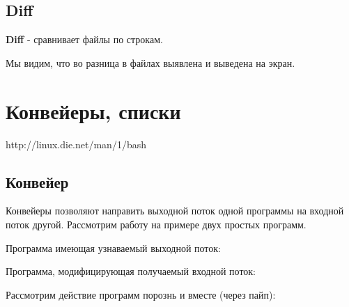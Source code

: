 \documentclass[a4paper]{article}
\begin{document}
\subsection{Diff}
\textbf{Diff} - сравнивает файлы по строкам.

Мы видим, что во разница в файлах выявлена и выведена на экран.

 
\section{Конвейеры, списки}
http://linux.die.net/man/1/bash
\subsection{Конвейер}
Конвейеры позволяют направить выходной поток одной программы на входной поток другой. Рассмотрим работу на примере двух простых программ.

Программа имеющая узнаваемый выходной поток:


Программа, модифицирующая получаемый входной поток:


Рассмотрим действие программ порознь и вместе (через пайп):

\end{document}
